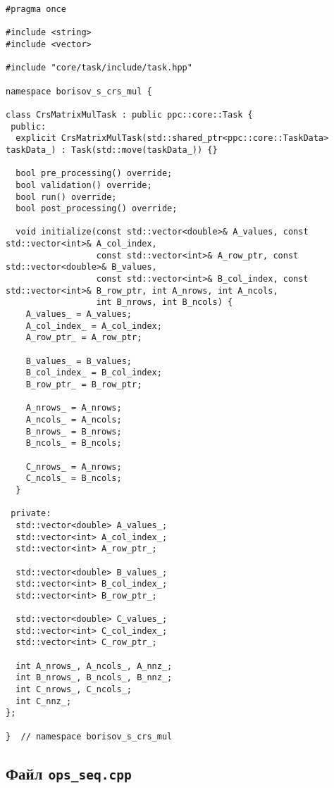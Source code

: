 \documentclass[12pt]{article}
\begin{document}
\begin{lstlisting}
#pragma once

#include <string>
#include <vector>

#include "core/task/include/task.hpp"

namespace borisov_s_crs_mul {

class CrsMatrixMulTask : public ppc::core::Task {
 public:
  explicit CrsMatrixMulTask(std::shared_ptr<ppc::core::TaskData> taskData_) : Task(std::move(taskData_)) {}

  bool pre_processing() override;
  bool validation() override;
  bool run() override;
  bool post_processing() override;

  void initialize(const std::vector<double>& A_values, const std::vector<int>& A_col_index,
                  const std::vector<int>& A_row_ptr, const std::vector<double>& B_values,
                  const std::vector<int>& B_col_index, const std::vector<int>& B_row_ptr, int A_nrows, int A_ncols,
                  int B_nrows, int B_ncols) {
    A_values_ = A_values;
    A_col_index_ = A_col_index;
    A_row_ptr_ = A_row_ptr;

    B_values_ = B_values;
    B_col_index_ = B_col_index;
    B_row_ptr_ = B_row_ptr;

    A_nrows_ = A_nrows;
    A_ncols_ = A_ncols;
    B_nrows_ = B_nrows;
    B_ncols_ = B_ncols;

    C_nrows_ = A_nrows;
    C_ncols_ = B_ncols;
  }

 private:
  std::vector<double> A_values_;
  std::vector<int> A_col_index_;
  std::vector<int> A_row_ptr_;

  std::vector<double> B_values_;
  std::vector<int> B_col_index_;
  std::vector<int> B_row_ptr_;

  std::vector<double> C_values_;
  std::vector<int> C_col_index_;
  std::vector<int> C_row_ptr_;

  int A_nrows_, A_ncols_, A_nnz_;
  int B_nrows_, B_ncols_, B_nnz_;
  int C_nrows_, C_ncols_;
  int C_nnz_;
};

}  // namespace borisov_s_crs_mul
\end{lstlisting}

\subsection*{Файл \texttt{ops\_seq.cpp}}
\end{document}
